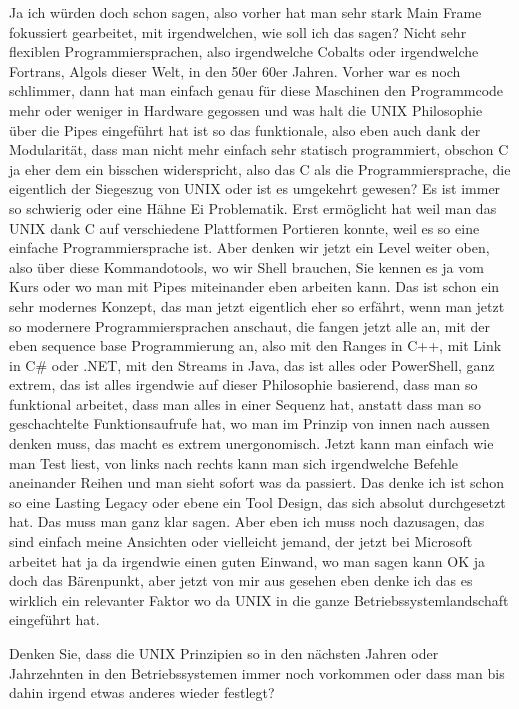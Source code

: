 \begin{description}
\NH Ja ich würden doch schon sagen, also vorher hat man sehr stark Main Frame fokussiert gearbeitet, mit irgendwelchen, wie soll ich das sagen? Nicht sehr flexiblen Programmiersprachen, also irgendwelche Cobalts oder irgendwelche Fortrans, Algols dieser Welt, in den 50er 60er Jahren. Vorher war es noch schlimmer, dann hat man einfach genau für diese Maschinen den Programmcode mehr oder weniger in Hardware gegossen und was halt die UNIX Philosophie über die Pipes eingeführt hat ist so das funktionale, also eben auch dank der Modularität, dass man nicht mehr einfach sehr statisch programmiert, obschon C ja eher dem ein bisschen widerspricht, also das C als die Programmiersprache, die eigentlich der Siegeszug von UNIX oder ist es umgekehrt gewesen? Es ist immer so schwierig oder eine Hähne Ei Problematik. Erst ermöglicht hat weil man das UNIX dank C auf verschiedene Plattformen Portieren konnte, weil es so eine einfache Programmiersprache ist. Aber denken wir jetzt ein Level weiter oben, also über diese Kommandotools, wo wir Shell brauchen, Sie kennen es ja vom Kurs oder wo man mit Pipes miteinander eben arbeiten kann. Das ist schon ein sehr modernes Konzept, das man jetzt eigentlich eher so erfährt, wenn man jetzt so modernere Programmiersprachen anschaut, die fangen jetzt alle an, mit der eben sequence base Programmierung an, also mit den Ranges in C++, mit Link in C\# oder .NET, mit den Streams in Java, das ist alles oder PowerShell, ganz extrem, das ist alles irgendwie auf dieser Philosophie basierend, dass man so funktional arbeitet, dass man alles in einer Sequenz hat, anstatt dass man so geschachtelte Funktionsaufrufe hat, wo man im Prinzip von innen nach aussen denken muss, das macht es extrem unergonomisch. Jetzt kann man einfach wie man Test liest, von links nach rechts kann man sich irgendwelche Befehle aneinander Reihen und man sieht sofort was da passiert. Das denke ich ist schon so eine Lasting Legacy oder ebene ein Tool Design, das sich absolut durchgesetzt hat. Das muss man ganz klar sagen. Aber eben ich muss noch dazusagen, das sind einfach meine Ansichten oder vielleicht jemand, der jetzt bei Microsoft arbeitet hat ja da irgendwie einen guten Einwand, wo man sagen kann \glqq OK ja doch das Bärenpunkt\grqq, aber jetzt von mir aus gesehen eben denke ich das es wirklich ein relevanter Faktor wo da UNIX in die ganze Betriebssystemlandschaft eingeführt hat.

\DS Denken Sie, dass die UNIX Prinzipien so in den nächsten Jahren oder Jahrzehnten in den Betriebssystemen immer noch vorkommen oder dass man bis dahin irgend etwas anderes wieder festlegt?


\end{description}

